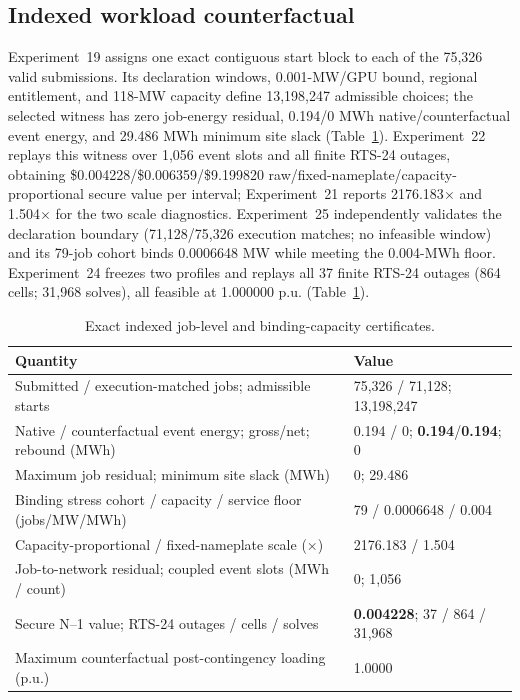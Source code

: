 \documentclass[10pt,journal]{IEEEtran}
\begin{document}
\subsection{Indexed workload counterfactual}

Experiment~19 assigns one exact contiguous start block to each of the 75,326
valid submissions. Its declaration windows, 0.001-MW/GPU bound, regional
entitlement, and 118-MW capacity define 13,198,247 admissible choices; the
selected witness has zero job-energy residual, 0.194/0 MWh native/counterfactual
event energy, and 29.486 MWh minimum site slack
(Table~\ref{tab:jobcounterfactual}). Experiment~22 replays this witness over
1,056 event slots and all finite RTS-24 outages, obtaining
\$0.004228/\$0.006359/\$9.199820 raw/fixed-nameplate/capacity-proportional
secure value per interval; Experiment~21 reports 2176.183\(\times\) and
1.504\(\times\) for the two scale diagnostics. Experiment~25 independently
validates the declaration boundary (71,128/75,326 execution matches; no
infeasible window) and its 79-job cohort binds 0.0006648 MW while meeting the
0.004-MWh floor. Experiment~24 freezes two profiles and replays all 37
finite RTS-24 outages (864 cells; 31,968 solves), all feasible at 1.000000 p.u.
(Table~\ref{tab:jobcounterfactual}).

\begin{table}[t]
\centering
\caption{Exact indexed job-level and binding-capacity certificates.}
\label{tab:jobcounterfactual}
\scriptsize
\begin{tabular}{@{}p{}p{}@{}}
\toprule
Quantity & Value\\
\midrule
Submitted / execution-matched jobs; admissible starts & 75,326 / 71,128; 13,198,247\\
Native / counterfactual event energy; gross/net; rebound (MWh) & 0.194 / 0; \textbf{0.194}/\textbf{0.194}; 0\\
Maximum job residual; minimum site slack (MWh) & 0; 29.486\\
Binding stress cohort / capacity / service floor (jobs/MW/MWh) & 79 / 0.0006648 / 0.004\\
Capacity-proportional / fixed-nameplate scale ($\times$) & 2176.183 / 1.504\\
Job-to-network residual; coupled event slots (MWh / count) & 0; 1,056\\
Secure N--1 value; RTS-24 outages / cells / solves & \textbf{0.004228}; 37 / 864 / 31,968\\
Maximum counterfactual post-contingency loading (p.u.) & 1.0000\\
\bottomrule
\end{tabular}
\end{table}
\end{document}
